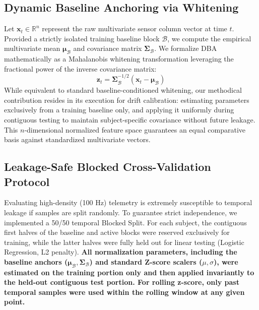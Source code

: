\documentclass{IEEE_lsens}
\begin{document}
\subsection{Dynamic Baseline Anchoring via Whitening}
Let $\mathbf{x}_t \in \mathbb{R}^n$ represent the raw multivariate sensor column vector at time $t$. Provided a strictly isolated training baseline block $\mathcal{B}$, we compute the empirical multivariate mean $\boldsymbol{\mu}_{\mathcal{B}}$ and covariance matrix $\boldsymbol{\Sigma}_{\mathcal{B}}$. We formalize DBA mathematically as a Mahalanobis whitening transformation leveraging the fractional power of the inverse covariance matrix:
\begin{equation}
\mathbf{z}_t = \boldsymbol{\Sigma}_{\mathcal{B}}^{-1/2} (\mathbf{x}_t - \boldsymbol{\mu}_{\mathcal{B}}) 
\end{equation}
While equivalent to standard baseline-conditioned whitening, our methodical contribution resides in its execution for drift calibration: estimating parameters exclusively from a training baseline only, and applying it uniformly during contiguous testing to maintain subject-specific covariance without future leakage. This $n$-dimensional normalized feature space guarantees an equal comparative basis against standardized multivariate vectors.



\subsection{Leakage-Safe Blocked Cross-Validation Protocol}
Evaluating high-density (100 Hz) telemetry is extremely susceptible to temporal leakage if samples are split randomly. To guarantee strict independence, we implemented a 50/50 temporal Blocked Split. For each subject, the contiguous first halves of the baseline and active blocks were reserved exclusively for training, while the latter halves were fully held out for linear testing (Logistic Regression, L2 penalty). \textbf{All normalization parameters, including the baseline anchors ($\boldsymbol{\mu}_{\mathcal{B}}, \boldsymbol{\Sigma}_{\mathcal{B}}$) and standard Z-score scalers ($\mu, \sigma$), were estimated on the training portion only and then applied invariantly to the held-out contiguous test portion. For rolling z-score, only past temporal samples were used within the rolling window at any given point.}
\end{document}
